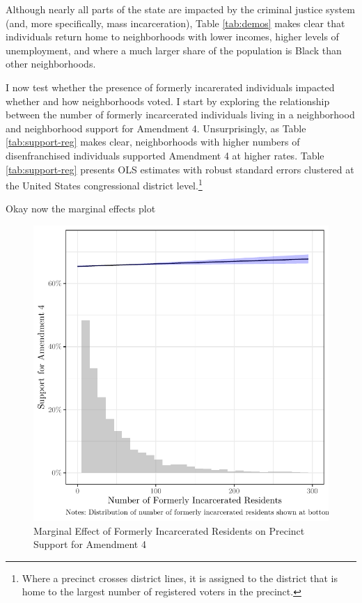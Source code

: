 \documentclass[
  12pt,
]{article}
\begin{document}


Although nearly all parts of the state are impacted by the criminal justice system (and, more specifically, mass incarceration), Table \ref{tab:demos} makes clear that individuals return home to neighborhoods with lower incomes, higher levels of unemployment, and where a much larger share of the population is Black than other neighborhoods.

I now test whether the presence of formerly incarerated individuals impacted whether and how neighborhoods voted. I start by exploring the relationship between the number of formerly incarcerated individuals living in a neighborhood and neighborhood support for Amendment 4. Unsurprisingly, as Table \ref{tab:support-reg} makes clear, neighborhoods with higher numbers of disenfranchised individuals supported Amendment 4 at higher rates. Table \ref{tab:support-reg} presents OLS estimates with robust standard errors clustered at the United States congressional district level.\footnote{Where a precinct crosses district lines, it is assigned to the district that is home to the largest number of registered voters in the precinct.}

\begin{singlespace}


\end{singlespace}

Okay now the marginal effects plot

\begin{figure}[H]

{\centering \includegraphics{write_files/figure-latex/marg1-1} 

}

\caption{\label{fig:marg1}Marginal Effect of Formerly Incarcerated Residents on Precinct Support for Amendment 4}\label{fig:marg1}
\end{figure}
\end{document}
